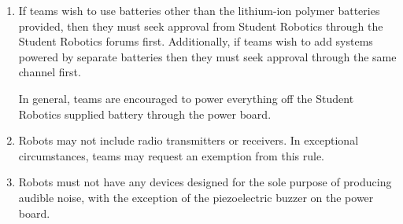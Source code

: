 \begin{enumerate}
\item If teams wish to use batteries other than the lithium-ion polymer batteries provided,
       then they must seek approval from Student Robotics through the Student Robotics forums first.
      Additionally, if teams wish to add systems powered by separate batteries then they must seek approval through the same channel first.

      In general, teams are encouraged to power everything off the Student Robotics supplied battery through the power board.

\item Robots may not include radio transmitters or receivers.
      In exceptional circumstances, teams may request an exemption from this rule.

\item Robots must not have any devices designed for the sole purpose of producing audible noise, with the exception of the piezoelectric buzzer on the power board.

\end{enumerate}
